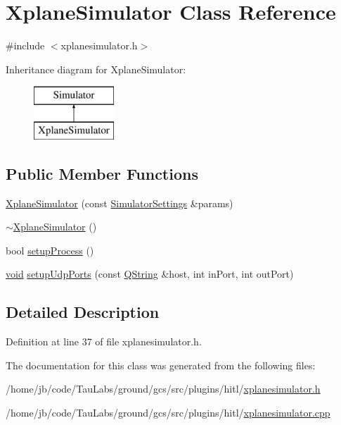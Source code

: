 \hypertarget{class_xplane_simulator}{\section{\-Xplane\-Simulator \-Class \-Reference}
\label{class_xplane_simulator}
}


{\ttfamily \#include $<$xplanesimulator.\-h$>$}

\-Inheritance diagram for \-Xplane\-Simulator\-:\begin{figure}[H]
\begin{center}
\leavevmode
\includegraphics[height=2.000000cm]{class_xplane_simulator}
\end{center}
\end{figure}
\subsection*{\-Public \-Member \-Functions}
\begin{DoxyCompactItemize}
\item 
\hyperlink{group___h_i_t_l_plugin_ga5832264c593dd9f80ac14145b83c28c9}{\-Xplane\-Simulator} (const \hyperlink{group___h_i_t_l_plugin_ga052199f1328d3002bce3e45345aa7f4e}{\-Simulator\-Settings} \&params)
\item 
\hyperlink{group___h_i_t_l_plugin_ga0254db12886ca7e399e2d27fef9e185a}{$\sim$\-Xplane\-Simulator} ()
\item 
bool \hyperlink{group___h_i_t_l_plugin_ga3818193fd63bfaf004e3aab25491f28c}{setup\-Process} ()
\item 
\hyperlink{group___u_a_v_objects_plugin_ga444cf2ff3f0ecbe028adce838d373f5c}{void} \hyperlink{group___h_i_t_l_plugin_ga84ae33286060d1b0d834fa2b5f20e2fe}{setup\-Udp\-Ports} (const \hyperlink{group___u_a_v_objects_plugin_gab9d252f49c333c94a72f97ce3105a32d}{\-Q\-String} \&host, int in\-Port, int out\-Port)
\end{DoxyCompactItemize}


\subsection{\-Detailed \-Description}


\-Definition at line 37 of file xplanesimulator.\-h.



\-The documentation for this class was generated from the following files\-:\begin{DoxyCompactItemize}
\item 
/home/jb/code/\-Tau\-Labs/ground/gcs/src/plugins/hitl/\hyperlink{xplanesimulator_8h}{xplanesimulator.\-h}\item 
/home/jb/code/\-Tau\-Labs/ground/gcs/src/plugins/hitl/\hyperlink{xplanesimulator_8cpp}{xplanesimulator.\-cpp}\end{DoxyCompactItemize}
